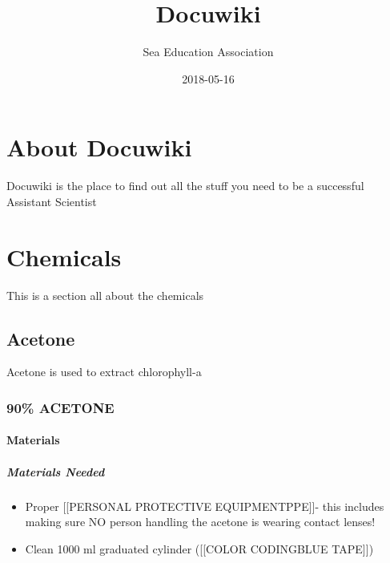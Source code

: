 \documentclass[]{book}
\title{Docuwiki}
\author{Sea Education Association}
\date{2018-05-16}
\providecommand{\tightlist}{%
  \setlength{\itemsep}{0pt}\setlength{\parskip}{0pt}}
\let\oldparagraph\paragraph
\renewcommand{\paragraph}[1]{\oldparagraph{#1}\mbox{}}
\theoremstyle{definition}
\theoremstyle{definition}
\theoremstyle{definition}
\theoremstyle{remark}
\begin{document}
\maketitle

{
\setcounter{tocdepth}{1}
\tableofcontents
}
\chapter*{About Docuwiki}\label{about-docuwiki}

Docuwiki is the place to find out all the stuff you need to be a
successful Assistant Scientist

\chapter*{Chemicals}\label{chemicals}

This is a section all about the chemicals

\section*{Acetone}\label{acetone}

Acetone is used to extract chlorophyll-a

\subsection*{90\% ACETONE}\label{acetone-1}

\subsubsection*{Materials}\label{materials}

\paragraph{Materials Needed}\label{materials-needed}

\begin{itemize}
\tightlist
\item
  Proper {[}{[}PERSONAL PROTECTIVE EQUIPMENT\textbar{}PPE{]}{]}- this
  includes making sure NO person handling the acetone is wearing contact
  lenses!
\item
  Clean 1000 ml graduated cylinder ({[}{[}COLOR CODING\textbar{}BLUE
  TAPE{]}{]})
\end{itemize}
\end{document}
